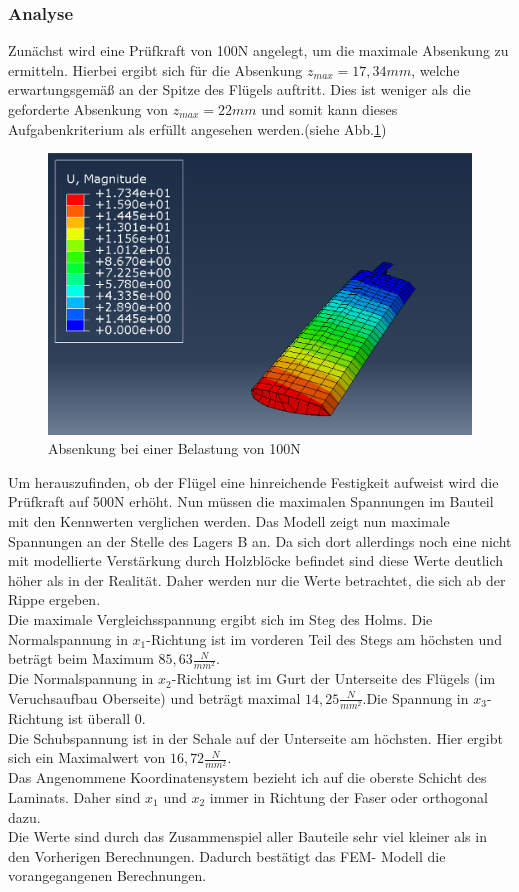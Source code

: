 \subsubsection{Analyse}
Zunächst wird eine Prüfkraft von 100N angelegt, um die maximale Absenkung zu ermitteln. Hierbei ergibt sich für die Absenkung $z_{max}=17,34mm$, welche erwartungsgemäß an der Spitze des Flügels auftritt. Dies ist weniger als die geforderte Absenkung von $z_{max}=22mm$ und somit kann dieses Aufgabenkriterium als erfüllt angesehen werden.(siehe Abb.\ref{Absenkung})
\begin{figure}[h]
 \centering
 \includegraphics[scale=0.4]{Bilder/Absenkung_100N}
 \caption{Absenkung bei einer Belastung von 100N}
 \label{Absenkung}
\end{figure}
\newpage
Um herauszufinden, ob der Flügel eine hinreichende Festigkeit aufweist wird die Prüfkraft auf 500N erhöht. Nun müssen die maximalen Spannungen im Bauteil mit den Kennwerten verglichen werden. Das Modell zeigt nun maximale Spannungen an der Stelle des Lagers B an. Da sich dort allerdings noch eine nicht mit modellierte Verstärkung durch Holzblöcke befindet sind diese Werte deutlich höher als in der Realität. Daher werden nur die Werte betrachtet, die sich ab der Rippe ergeben.\\
Die maximale Vergleichsspannung ergibt sich im Steg des Holms. Die Normalspannung in $x_{1}$-Richtung ist im vorderen Teil des Stegs am höchsten und beträgt beim Maximum $85,63\frac{N}{mm^2}$.\\
Die Normalspannung in $x_{2}$-Richtung ist im Gurt der Unterseite des Flügels (im Veruchsaufbau Oberseite) und beträgt maximal $14,25\frac{N}{mm^2}$.Die Spannung in $x_{3}$-Richtung ist überall 0.\\
Die Schubspannung ist in der Schale auf der Unterseite am höchsten. Hier ergibt sich ein Maximalwert von $16,72\frac{N}{mm^2}$.\\
Das Angenommene Koordinatensystem bezieht ich auf die oberste Schicht des Laminats. Daher sind $x_{1}$ und $x_{2}$ immer in Richtung der Faser oder orthogonal dazu.\\
Die Werte sind durch das Zusammenspiel aller Bauteile sehr viel kleiner als in den Vorherigen Berechnungen. Dadurch bestätigt das FEM- Modell die vorangegangenen Berechnungen.
\newpage
